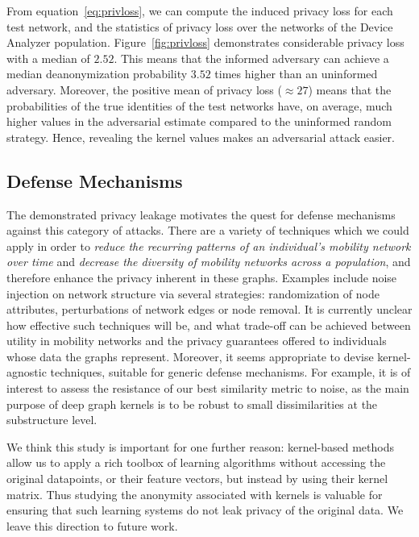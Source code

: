 From equation~\eqref{eq:privloss}, we can compute the induced privacy loss for each test network, and the statistics of privacy loss over the networks of the Device Analyzer population.
Figure~\ref{fig:privloss} demonstrates considerable privacy loss with a median of $ 2.52 $.
This means that the informed adversary can achieve a median deanonymization probability $3.52$ times higher than an uninformed adversary.
Moreover, the positive mean of privacy loss ($ {\approx  27}$) means that the probabilities of  the true identities of the test networks have, on average, much higher values in the adversarial estimate compared to the uninformed random strategy.
Hence, revealing the kernel values makes an adversarial attack easier.

\subsection{Defense Mechanisms }

The demonstrated privacy leakage motivates the quest
for defense mechanisms against this category of attacks.
There are a variety of techniques which we could apply in order to \emph{reduce the recurring patterns of an individual's mobility network over time} and \emph{decrease the diversity of mobility networks across a population}, and therefore enhance the privacy inherent in these graphs.
Examples include noise injection on network structure via several strategies: randomization of node attributes, perturbations of network edges or node removal.
It is currently unclear how effective such techniques will be, and what trade-off can be achieved between utility in mobility networks and the privacy guarantees offered to individuals whose data the graphs represent.
Moreover, it seems appropriate to devise kernel-agnostic techniques, suitable for generic defense mechanisms.
For example, it is of interest to assess the resistance of our best similarity metric to noise, as the main purpose of deep graph kernels is to be robust to small dissimilarities at the substructure level.

We think this study is important for one further reason: kernel-based methods allow us to apply a rich toolbox
of learning algorithms without accessing the original datapoints, or their feature vectors, but instead by using their kernel matrix.
Thus studying the anonymity associated with kernels is valuable for ensuring that such learning systems do not leak privacy of the original data.
We leave this direction to future work.
